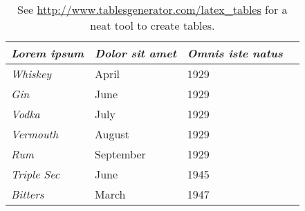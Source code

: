 \begin{table}[h]
\begin{tabulary}{\textwidth}{@{}Jllr@{}}
\toprule
\textit{Lorem ipsum}                & \textit{Dolor sit amet}   & \textit{Omnis iste natus} \\ \midrule
\textit{Whiskey}     & April        & 1929   \\
\textit{Gin}         & June         & 1929   \\
\textit{Vodka}       & July         & 1929   \\
\textit{Vermouth}    & August       & 1929   \\
\textit{Rum}         & September    & 1929   \\
\textit{Triple Sec}  & June         & 1945   \\
\textit{Bitters}     & March        & 1947   \\ \bottomrule
\end{tabulary}
\caption{See \url{http://www.tablesgenerator.com/latex_tables} for a neat tool to create tables.}
\label{table:archival}
\end{table}
